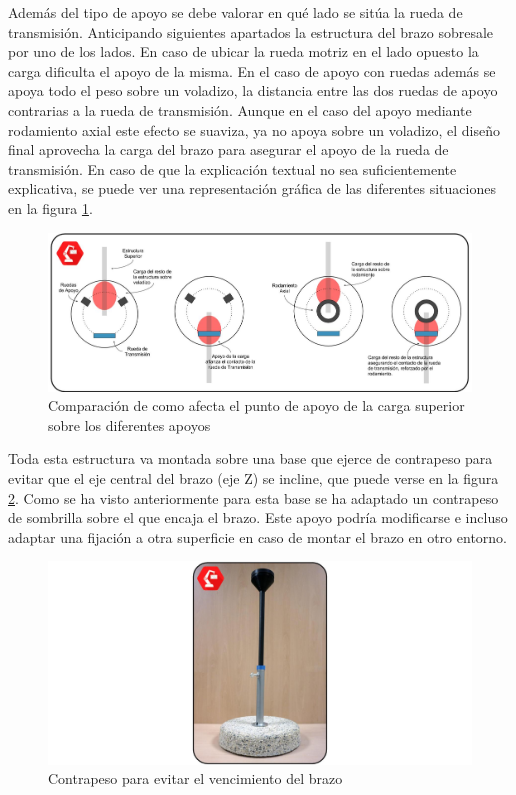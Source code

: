     Además del tipo de apoyo se debe valorar en qué lado se sitúa la rueda de transmisión. Anticipando siguientes apartados la estructura del brazo sobresale por uno de los lados. En caso de ubicar la rueda motriz en el lado opuesto la carga dificulta el apoyo de la misma. En el caso de apoyo con ruedas además se apoya todo el peso sobre un voladizo, la distancia entre las dos ruedas de apoyo contrarias a la rueda de transmisión. Aunque en el caso del apoyo mediante rodamiento axial este efecto se suaviza, ya no apoya sobre un voladizo, el diseño final aprovecha la carga del brazo para asegurar el apoyo de la rueda de transmisión. En caso de que la explicación textual no sea suficientemente explicativa, se puede ver una representación gráfica de las diferentes situaciones en la figura \ref{fig:Mecanica:apoyo_carga}.

    \begin{figure}[H]
        \centering
        \includegraphics[width=\textwidth]{figuras/Imagenes_Mecanica/comparacion_apoyos.jpg}
        \caption{Comparación de como afecta el punto de apoyo de la carga superior sobre los diferentes apoyos}
        \label{fig:Mecanica:apoyo_carga}
    \end{figure}

    Toda esta estructura va montada sobre una base que ejerce de contrapeso para evitar que el eje central del brazo (eje Z) se incline, que puede verse en la figura \ref{fig:Mecanica:contrapeso}. Como se ha visto anteriormente para esta base se ha adaptado un contrapeso de sombrilla sobre el que encaja el brazo. Este apoyo podría modificarse e incluso adaptar una fijación a otra superficie en caso de montar el brazo en otro entorno.

   \begin{figure}[H]
      	\centering
      	\includegraphics[width=\textwidth]{figuras/Imagenes_Mecanica/foto_brazo_13.jpg}
      	\caption{Contrapeso para evitar el vencimiento del brazo}
      	\label{fig:Mecanica:contrapeso}
   \end{figure}


